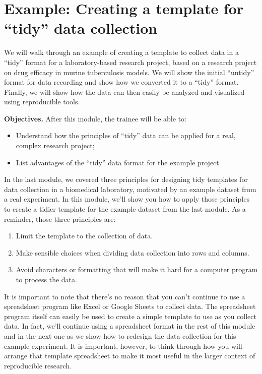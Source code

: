 \documentclass[]{tufte-book}
\providecommand{\tightlist}{%
  \setlength{\itemsep}{0pt}\setlength{\parskip}{0pt}}
\begin{document}
\section{Example: Creating a template for ``tidy'' data collection}\label{module5}

We will walk through an example of creating a template to collect data in a
``tidy'' format for a laboratory-based research project, based on a research
project on drug efficacy in murine tuberculosis models. We will show the initial
``untidy'' format for data recording and show how we converted it to a ``tidy''
format. Finally, we will show how the data can then easily be analyzed and
visualized using reproducible tools.

\textbf{Objectives.} After this module, the trainee will be able to:

\begin{itemize}
\tightlist
\item
  Understand how the principles of ``tidy'' data can be applied for a real, complex research project;
\item
  List advantages of the ``tidy'' data format for the example project
\end{itemize}

In the last module, we covered three principles for designing tidy templates for
data collection in a biomedical laboratory, motivated by an example dataset from
a real experiment. In this module, we'll show you how to apply those principles
to create a tidier template for the example dataset from the last module.
As a reminder, those three principles are:

\begin{enumerate}
\def\labelenumi{\arabic{enumi}.}
\tightlist
\item
  Limit the template to the collection of data.
\item
  Make sensible choices when dividing data collection into rows and columns.
\item
  Avoid characters or formatting that will make it hard for a computer program to process the data.
\end{enumerate}

It is important to note that there's no reason that you can't continue to use a
spreadsheet program like Excel or Google Sheets to collect data. The spreadsheet
program itself can easily be used to create a simple template to use as you
collect data. In fact, we'll continue using a spreadsheet format in the rest of
this module and in the next one as we show how to redesign the data collection
for this example experiment. It is important, however, to think through how you
will arrange that template spreadsheet to make it most useful in the larger
context of reproducible research.
\end{document}
